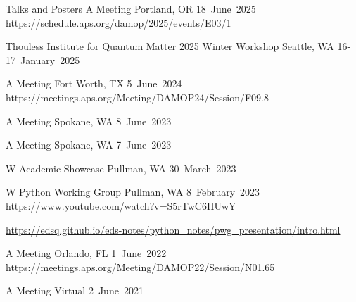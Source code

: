 \begin{rubric}{Talks and Posters}
            {A  Meeting}
            {Portland, OR}
            {18~June~2025}
            {https://schedule.aps.org/damop/2025/events/E03/1}

            {Thouless Institute for Quantum Matter 2025 Winter Workshop}
            {Seattle, WA}
            {16-17~January~2025}
            {}

            {A  Meeting}
            {Fort Worth, TX}
            {5~June~2024}
            {https://meetings.aps.org/Meeting/DAMOP24/Session/F09.8}

            {A  Meeting}
            {Spokane, WA}
            {8~June~2023}
            {}

            {A  Meeting}
            {Spokane, WA}
            {7~June~2023}
            {}

            {W Academic Showcase}
            {Pullman, WA}
            {30~March~2023}
            {}

            {W Python Working Group}
            {Pullman, WA}
            {8~February~2023}
            {https://www.youtube.com/watch?v=S5rTwC6HUwY}

            \url{https://edsq.github.io/eds-notes/python_notes/pwg_presentation/intro.html}

            {A  Meeting}
            {Orlando, FL}
            {1~June~2022}
            {https://meetings.aps.org/Meeting/DAMOP22/Session/N01.65}

            {A  Meeting}
            {Virtual}
            {2~June~2021}
            {}

\end{rubric}

\endgroup
